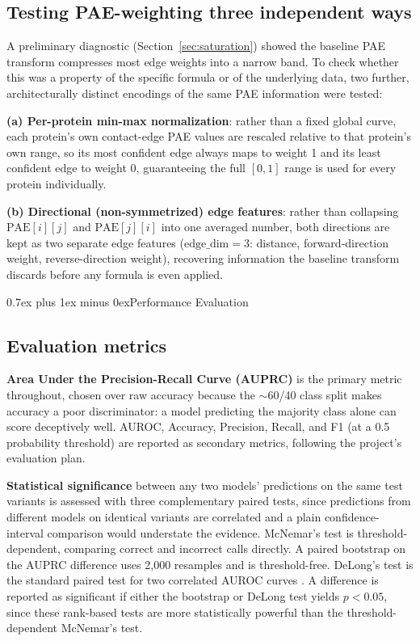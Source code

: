 \documentclass[10pt,conference,a4paper]{IEEEtran}
\makeatletter
\def\section{\@startsection{section}{1}{\z@}{1.5ex plus 1.5ex minus 0.5ex}%
{0.7ex plus 1ex minus 0ex}{\normalfont\normalsize\bfseries\centering}}%
\makeatother
\begin{document}
\subsection{Testing PAE-weighting three independent ways}
\label{sec:threeways}

A preliminary diagnostic (Section~\ref{sec:saturation}) showed the baseline PAE transform compresses most edge weights into a narrow band. To check whether this was a property of the specific formula or of the underlying data, two further, architecturally distinct encodings of the same PAE information were tested:

\textbf{(a) Per-protein min-max normalization}: rather than a fixed global curve, each protein's own contact-edge PAE values are rescaled relative to that protein's own range, so its most confident edge always maps to weight 1 and its least confident edge to weight 0, guaranteeing the full $[0,1]$ range is used for every protein individually.

\textbf{(b) Directional (non-symmetrized) edge features}: rather than collapsing $\mathrm{PAE}[i][j]$ and $\mathrm{PAE}[j][i]$ into one averaged number, both directions are kept as two separate edge features ($\mathrm{edge\_dim}=3$: distance, forward-direction weight, reverse-direction weight), recovering information the baseline transform discards before any formula is even applied.

\section{Performance Evaluation}
\label{sec:results}

\subsection{Evaluation metrics}
\label{sec:metrics}

\textbf{Area Under the Precision-Recall Curve (AUPRC)} is the primary metric throughout, chosen over raw accuracy because the $\sim$60/40 class split makes accuracy a poor discriminator: a model predicting the majority class alone can score deceptively well. AUROC, Accuracy, Precision, Recall, and F1 (at a 0.5 probability threshold) are reported as secondary metrics, following the project's evaluation plan.

\textbf{Statistical significance} between any two models' predictions on the same test variants is assessed with three complementary paired tests, since predictions from different models on identical variants are correlated and a plain confidence-interval comparison would understate the evidence. McNemar's test is threshold-dependent, comparing correct and incorrect calls directly. A paired bootstrap on the AUPRC difference uses 2{,}000 resamples and is threshold-free. DeLong's test is the standard paired test for two correlated AUROC curves \cite{delong1988auc}. A difference is reported as significant if either the bootstrap or DeLong test yields $p<0.05$, since these rank-based tests are more statistically powerful than the threshold-dependent McNemar's test.
\end{document}
